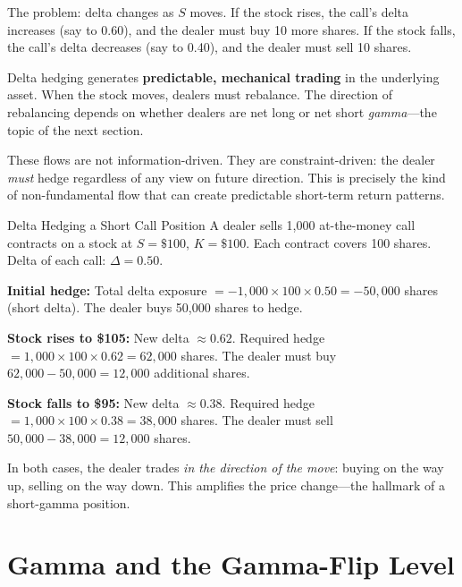 The problem: delta changes as $S$ moves.  If the stock rises, the
call's delta increases (say to 0.60), and the dealer must buy
10 more shares.  If the stock falls, the call's delta decreases
(say to 0.40), and the dealer must sell 10 shares.

\begin{keyidea}
Delta hedging generates \textbf{predictable, mechanical trading} in
the underlying asset.  When the stock moves, dealers must rebalance.
The direction of rebalancing depends on whether dealers are net long
or net short \emph{gamma}---the topic of the next section.

These flows are not information-driven.  They are constraint-driven:
the dealer \emph{must} hedge regardless of any view on future
direction.  This is precisely the kind of non-fundamental flow that
can create predictable short-term return patterns.
\end{keyidea}

\begin{workedexample}{Delta Hedging a Short Call Position}
A dealer sells 1{,}000 at-the-money call contracts on a stock at
$S = \$100$, $K = \$100$.  Each contract covers 100 shares.
Delta of each call: $\Delta = 0.50$.

\textbf{Initial hedge:}
Total delta exposure $= -1{,}000 \times 100 \times 0.50
  = -50{,}000$ shares (short delta).
The dealer buys 50{,}000 shares to hedge.

\textbf{Stock rises to \$105:}
New delta $\approx 0.62$.
Required hedge $= 1{,}000 \times 100 \times 0.62 = 62{,}000$ shares.
The dealer must buy $62{,}000 - 50{,}000 = 12{,}000$ additional shares.

\textbf{Stock falls to \$95:}
New delta $\approx 0.38$.
Required hedge $= 1{,}000 \times 100 \times 0.38 = 38{,}000$ shares.
The dealer must sell $50{,}000 - 38{,}000 = 12{,}000$ shares.

In both cases, the dealer trades \emph{in the direction of the move}:
buying on the way up, selling on the way down.  This amplifies the
price change---the hallmark of a short-gamma position.
\end{workedexample}


\section{Gamma and the Gamma-Flip Level}
\label{sec:gamma}

